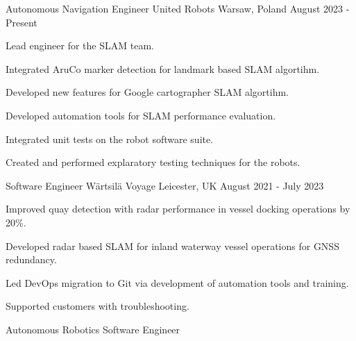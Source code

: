 

\begin{cventries}

  \cventry
    {Autonomous Navigation Engineer} %
    {United Robots} %
    {Warsaw, Poland} %
    {August 2023 - Present} %
    {
      \begin{cvitems} %
        \item {Lead engineer for the SLAM team.}
        \item {Integrated AruCo marker detection for landmark based SLAM algortihm.}
        \item {Developed new features for Google cartographer SLAM algortihm.}
        \item {Developed automation tools for SLAM performance evaluation.}
        \item {Integrated unit tests on the robot software suite.}
        \item {Created and performed explaratory testing techniques for the robots.}
      \end{cvitems}
    }
  \cventry
    {Software Engineer} %
    {Wärtsilä Voyage} %
    {Leicester, UK} %
    {August 2021 - July 2023} %
    {
      \begin{cvitems} %
        \item {Improved quay detection with radar performance in vessel docking operations by 20\%.}
        \item {Developed radar based SLAM for inland waterway vessel operations for GNSS redundancy.}
        \item {Led DevOps migration to Git via development of automation tools and training.}
        \item {Supported customers with troubleshooting.}
      \end{cvitems}
    }
  \cventry
    {Autonomous Robotics Software Engineer} %

\end{cventries}
